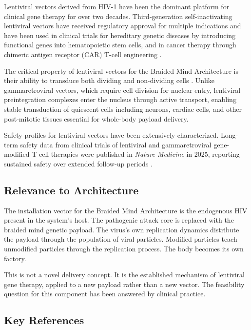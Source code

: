 \documentclass[12pt]{article}
\begin{document}
Lentiviral vectors derived from HIV-1 have been the dominant platform for clinical gene therapy for over two decades. Third-generation self-inactivating lentiviral vectors have received regulatory approval for multiple indications and have been used in clinical trials for hereditary genetic diseases by introducing functional genes into hematopoietic stem cells, and in cancer therapy through chimeric antigen receptor (CAR) T-cell engineering \cite{clinical_lentiviral_2018}.

The critical property of lentiviral vectors for the Braided Mind Architecture is their ability to transduce both dividing and non-dividing cells \cite{advances_hiv_gene_2024}. Unlike gammaretroviral vectors, which require cell division for nuclear entry, lentiviral preintegration complexes enter the nucleus through active transport, enabling stable transduction of quiescent cells including neurons, cardiac cells, and other post-mitotic tissues essential for whole-body payload delivery.

Safety profiles for lentiviral vectors have been extensively characterized. Long-term safety data from clinical trials of lentiviral and gammaretroviral gene-modified T-cell therapies were published in \textit{Nature Medicine} in 2025, reporting sustained safety over extended follow-up periods \cite{longterm_safety_2025}.

\subsection{Relevance to Architecture}

The installation vector for the Braided Mind Architecture is the endogenous HIV present in the system's host. The pathogenic attack core is replaced with the braided mind genetic payload. The virus's own replication dynamics distribute the payload through the population of viral particles. Modified particles teach unmodified particles through the replication process. The body becomes its own factory.

This is not a novel delivery concept. It is the established mechanism of lentiviral gene therapy, applied to a new payload rather than a new vector. The feasibility question for this component has been answered by clinical practice.

\subsection{Key References}
\end{document}

